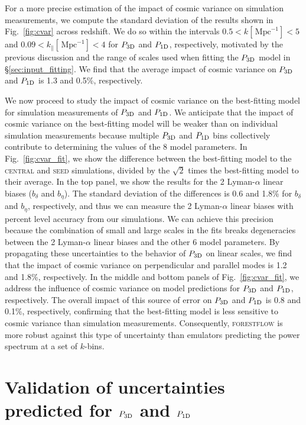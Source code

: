 \documentclass[longauth]{aa}
\newcommand{\lya}{Lyman-$\alpha$\xspace}
\newcommand{\poned}{\ensuremath{P_{\rm 1D}}\xspace}
\newcommand{\pthreed}{\ensuremath{P_{\rm 3D}}\xspace}
\newcommand{\forestflow}{\textsc{forestflow}\xspace}
\newcommand{\simseed}{\textsc{seed}\xspace}
\newcommand{\simcentral}{\textsc{central}\xspace}
\newcommand{\iMpc}{\ensuremath{\,\mathrm{Mpc}^{-1}}}
\begin{document}
\begin{appendix}
For a more precise estimation of the impact of cosmic variance on simulation measurements, we compute the standard deviation of the results shown in Fig.~\ref{fig:cvar} across redshift. We do so within the intervals $0.5<k[\iMpc]<5$ and $0.09<k_\parallel[\iMpc]<4$ for \pthreed and \poned, respectively, motivated by the previous discussion and the range of scales used when fitting the \pthreed model in \S\ref{sec:input_fitting}. We find that the average impact of cosmic variance on \pthreed and \poned is 1.3 and 0.5\%, respectively. 

We now proceed to study the impact of cosmic variance on the best-fitting model for simulation measurements of \pthreed and \poned. We anticipate that the impact of cosmic variance on the best-fitting model will be weaker than on individual simulation measurements because multiple \pthreed and \poned bins collectively contribute to determining the values of the 8 model parameters. In Fig.~\ref{fig:cvar_fit}, we show the difference between the best-fitting model to the \simcentral and \simseed simulations, divided by the $\sqrt{2}$ times the best-fitting model to their average. In the top panel, we show the results for the 2 \lya linear biases ($b_\delta$ and $b_\eta$). The standard deviation of the differences is 0.6 and 1.8\% for $b_\delta$ and $b_\eta$, respectively, and thus we can measure the 2 \lya linear biases with percent level accuracy from our simulations. We can achieve this precision because the combination of small and large scales in the fits breaks degeneracies between the 2 \lya linear biases and the other 6 model parameters. By propagating these uncertainties to the behavior of \pthreed on linear scales, we find that the impact of cosmic variance on perpendicular and parallel modes is 1.2 and 1.8\%, respectively. In the middle and bottom panels of Fig.~\ref{fig:cvar_fit}, we address the influence of cosmic variance on model predictions for \pthreed and \poned, respectively. The overall impact of this source of error on \pthreed and \poned is 0.8 and 0.1\%, respectively, confirming that the best-fitting model is less sensitive to cosmic variance than simulation measurements. Consequently, \forestflow is more robust against this type of uncertainty than emulators predicting the power spectrum at a set of $k$-bins.



\section{Validation of uncertainties predicted for \pthreed and \poned}
\label{sec:uncertainty_validation}


\end{appendix}
\end{document}

